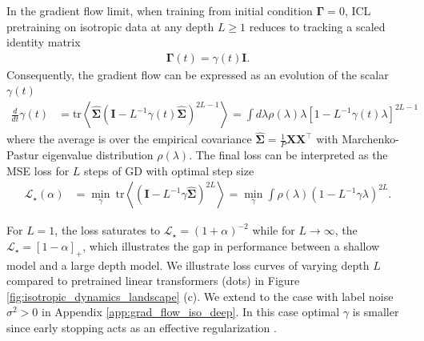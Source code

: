 \documentclass{article} %
\begin{document}



\begin{tcolorbox}[colframe=myblue, opacityback=0.95, title=Result 1: Gradient Flow for Isotropic Covariates (ISO)] 
In the gradient flow limit, when training from initial condition $\bm\Gamma =0$, ICL pretraining on isotropic data at any depth $L \geq 1$ reduces to tracking a scaled identity matrix 
    \begin{align}
       \bm\Gamma(t) = \gamma(t) \bm I  .
    \end{align} 
    Consequently, the gradient flow can be expressed as an evolution of the scalar $\gamma(t)$
    \begin{align}
        \frac{d}{dt} \gamma(t) &= \text{tr} \left< \bm{\hat\Sigma} \left( \bm I - L^{-1} \gamma(t) \bm{\hat\Sigma} \right)^{2L-1}  \right>  =  \int d\lambda \rho(\lambda) \lambda \left[ 1 - L^{-1} \gamma(t) \lambda \right]^{2L-1}
    \end{align}
    where the average is over the empirical covariance $\bm{\hat\Sigma} = \frac{1}{P}\bm X \bm X^\top$ with Marchenko-Pastur eigenvalue distribution $\rho(\lambda)$. The final loss can be interpreted as the MSE loss for $L$ steps of GD with optimal step size 
    \begin{align}
        \mathcal L_\star(\alpha) &= \min_{\gamma} \ \text{tr} \left< \left( \bm I - L^{-1}\gamma \hat{\bm\Sigma} \right)^{2L} \right> =  \min_{\gamma} \int \rho(\lambda)   \left( 1 - L^{-1} \gamma \lambda \right)^{2L} .
    \end{align}
\end{tcolorbox}

For $L=1$, the loss saturates to $\mathcal L_\star = (1 + \alpha)^{-2}$ while for $L\to\infty$, the $\mathcal L_\star = [1 - \alpha]_+$, which illustrates the gap in performance between a shallow model and a large depth model. We illustrate loss curves of varying depth $L$ compared to pretrained linear transformers (dots) in Figure \ref{fig:isotropic_dynamics_landscape} (c). We extend to the case with label noise $\sigma^2>0$ in Appendix \ref{app:grad_flow_iso_deep}. In this case optimal $\gamma$ is smaller since early stopping acts as an effective regularization \citep{advani2020high, sonthalia2024regularization}. 
\end{document}

